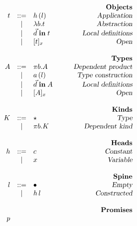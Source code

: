 \begin{figure}

\begin{center}
\begin{math}
\begin{array}{rclr}
&&&\qquad\textsl{\bf Objects}\\
t 

&::=& 
h\,(l) 
& \qquad\textsl{Application}
\\

&|&
\lambda b. t
& \qquad\textsl{Abstraction}
\\

&|&
\vec{d} \;\textbf{in}\; t
& \qquad\textsl{Local definitions}
\\

&|&
[ t ]_{x}
& \qquad\textsl{Open}
\\
\\
&&&\qquad\textsl{\bf Types}\\
A

&::=& 
\pi b. A
& \qquad\textsl{Dependent product}
\\

&|& 
a\,(l)
& \qquad\textsl{Type construction}
\\

&|& 
\vec{d} \;\textbf{in}\; A
& \qquad\textsl{Local definitions}
\\


&|& 
[ A ]_{x}
& \qquad\textsl{Open}
\\
\\
&&&\qquad\textsl{\bf Kinds}\\
K

&::=&
\star
& \qquad\textsl{Type}
\\

&|&
\pi b. K
& \qquad\textsl{Dependent kind}
\\
\\

&&&\qquad\textsl{\bf Heads}\\
h

&::=& 
c
& \qquad\textsl{Constant}
\\
&|& 
x
& \qquad\textsl{Variable}
\\
\\
&&&\qquad\textsl{\bf Spine}\\
l

&::=& \bullet
& \qquad\textsl{Empty}
\\
&|& h\,l
& \qquad\textsl{Constructed}
\\
\\
&&&\qquad\textsl{\bf Promises}\\
p 


\end{array}
\end{math}
\end{center}
\end{figure}
